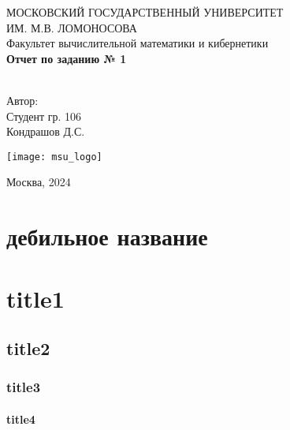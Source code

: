 \documentclass[a4paper,12pt]{article} %
\begin{document}
	
	\begin{center}
		МОСКОВСКИЙ ГОСУДАРСТВЕННЫЙ УНИВЕРСИТЕТ \\
		ИМ. М.В. ЛОМОНОСОВА \\
		
		
		\hfill \break %
		Факультет вычислительной математики и кибернетики\\
		\vspace{2.5cm}  %
		\large{\textbf{Отчет по заданию № 1}}\\ %
		\hfill \break
		\\
	\end{center}
	
	\begin{flushright}  %
		Автор:\\
		Студент гр. 106\\
		Кондрашов Д.С.
	\end{flushright}
	
	\vspace{7cm}
	
	\begin{center}
		\texttt{[image: msu\_logo]}
	\end{center}
	\vfill %
	\begin{center} Москва, 2024 \end{center}
	\thispagestyle{empty} %

	\newpage
	
	\tableofcontents %
	\section*{дебильное название} %
	\section{title1} %
	\subsection{title2} %
	\subsubsection{title3}
	\paragraph{title4} 
\end{document}
